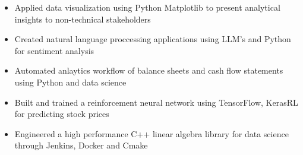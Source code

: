 \documentclass[11pt,a4paper,ragged2e]{altacv}
\begin{document}
\begin{paracol}{1}
\begin{itemize}
\item Applied data visualization using Python Matplotlib to present analytical insights to non-technical stakeholders
\item Created natural language proccessing applications using LLM's and Python for sentiment analysis
\item Automated anlaytics workflow of balance sheets and cash flow statements using Python and data science
\item Built and trained a reinforcement neural network using TensorFlow, KerasRL for predicting stock prices
\item Engineered a high performance C++ linear algebra library for data science through Jenkins, Docker and Cmake
\end{itemize}
\tightdivider


\end{paracol}
\end{document}
